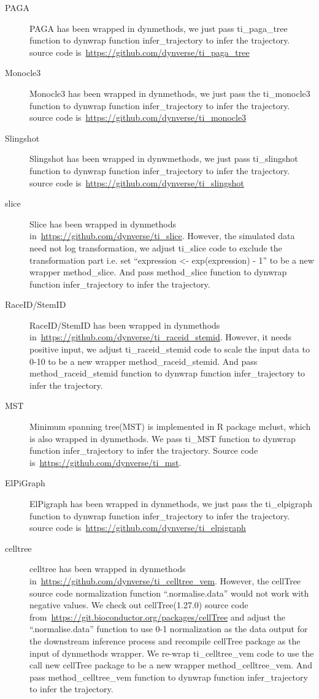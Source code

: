\begin{description}
	\item[PAGA] 
	PAGA has been wrapped in dynmethods, we just pass ti\_paga\_tree function to dynwrap function infer\_trajectory to infer the trajectory. source code is~\url{https://github.com/dynverse/ti\_paga\_tree}

	\item[Monocle3]
	Monocle3 has been wrapped in dynmethods, we just pass the ti\_monocle3 function to dynwrap function infer\_trajectory to infer the trajectory. source code is~\url{https://github.com/dynverse/ti\_monocle3}

	\item[Slingshot]
	Slingshot has been wrapped in dynwmethods, we just pass ti\_slingshot function to dynwrap function infer\_trajectory to infer the trajectory. source code is~\url{https://github.com/dynverse/ti\_slingshot}

	\item[slice]
	Slice has been wrapped in dynmethods in~\url{https://github.com/dynverse/ti\_slice}. However, the simulated data need not log transformation, we adjust ti\_slice code to exclude the transformation part i.e. set ``expression <- exp(expression) - 1'' to be a new wrapper method\_slice. And pass method\_slice function to dynwrap function infer\_trajectory to infer the trajectory.

	\item[RaceID/StemID]
	RaceID/StemID has been wrapped in dynmethods in~\url{https://github.com/dynverse/ti\_raceid\_stemid}. However, it needs positive input, we adjust ti\_raceid\_stemid code to scale the input data to 0-10 to be a new wrapper method\_raceid\_stemid. And pass method\_raceid\_stemid function to dynwrap function infer\_trajectory to infer the trajectory.

	\item[MST] 
	Minimum spanning tree(MST) is implemented in R package mclust, which is also wrapped in dynmethods. We pass ti\_MST function to dynwrap function infer\_trajectory to infer the trajectory. Source code is~\url{https://github.com/dynverse/ti\_mst}.

	\item[ElPiGraph] 
	ElPigraph has been wrapped in dynmethods, we just pass the ti\_elpigraph function to dynwrap function infer\_trajectory to infer the trajectory. source code is~\url{https://github.com/dynverse/ti_elpigraph}

	\item[celltree] 
	celltree has been wrapped in dynmethods in~\url{https://github.com/dynverse/ti\_celltree\_vem}. However, the cellTree source code normalization function ``.normalise.data'' would not work with negative values. We check out cellTree(1.27.0) source code from~\url{https://git.bioconductor.org/packages/cellTree} and adjust the ``.normalise.data'' function to use 0-1 normalization as the data output for the downstream inference process and recompile cellTree package as the input of dynmethods wrapper. We re-wrap ti\_celltree\_vem code to use the call new cellTree package to be a new wrapper method\_celltree\_vem. And pass method\_celltree\_vem function to dynwrap function infer\_trajectory to infer the trajectory.


\end{description}
